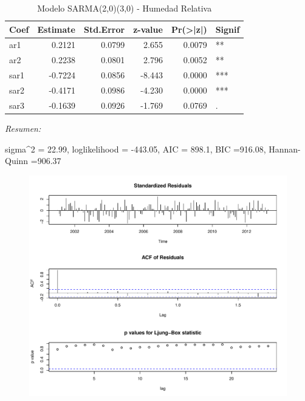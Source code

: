 \documentclass[12pt,oneside]{book}\usepackage[]{graphicx}\usepackage[]{color}
\makeatletter
\def\maxwidth{ %
  \ifdim\Gin@nat@width>\linewidth
    \linewidth
  \else
    \Gin@nat@width
  \fi
}
\newenvironment{knitrout}{}{} %
\theoremstyle{definition} %
\makeatother
\begin{document}
\begin{enumerate}
\begin{knitrout}
\color{fgcolor}\begin{table}

\caption{\label{tab:model_x4}\label{tab:sarma_humed}Modelo SARMA(2,0)(3,0) - Humedad Relativa}
\centering
\begin{threeparttable}
\begin{tabular}[t]{lrrrrl}
\toprule
Coef & Estimate & Std.Error & z-value & Pr(>|z|) & Signif\\
\midrule
\rowcolor{gray!6}  ar1 & 0.2121 & 0.0799 & 2.655 & 0.0079 & **\\
ar2 & 0.2238 & 0.0801 & 2.796 & 0.0052 & **\\
\rowcolor{gray!6}  sar1 & -0.7224 & 0.0856 & -8.443 & 0.0000 & ***\\
sar2 & -0.4171 & 0.0986 & -4.230 & 0.0000 & ***\\
\rowcolor{gray!6}  sar3 & -0.1639 & 0.0926 & -1.769 & 0.0769 & .\\
\bottomrule
\end{tabular}
\begin{tablenotes}
\item \textit{Resumen:} 
\item sigma\textasciicircum{}2 = 22.99, loglikelihood = -443.05, AIC = 898.1, BIC =916.08, Hannan-Quinn =906.37
\end{tablenotes}
\end{threeparttable}
\end{table}


\end{knitrout}


\begin{knitrout}
\color{fgcolor}\begin{figure}[H]

{\centering \includegraphics[width=\maxwidth]{figure/unnamed-chunk-38-1} 

}
\end{figure}
\end{knitrout}
\end{enumerate}
\end{document}

